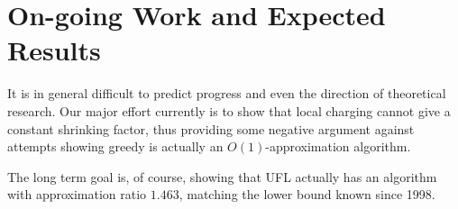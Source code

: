 \documentclass[11pt]{article}
\begin{document}
\section{On-going Work and Expected Results}
It is in general difficult to predict progress and even the direction
of theoretical research. Our major effort currently is to show that
local charging cannot give a constant shrinking factor, thus providing
some negative argument against attempts showing greedy is actually an
$O(1)$-approximation algorithm.

The long term goal is, of course, showing that UFL actually has an
algorithm with approximation ratio $1.463$, matching the lower bound
known since 1998.
\end{document}
